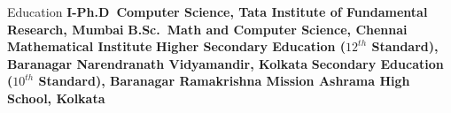 \begin{rubric}{Education}
\entry*[2024 -- current]%
	\textbf{I-Ph.D~Computer Science, Tata Institute of Fundamental Research, Mumbai} 
%
\entry*[2021 -- 2024]%
	\textbf{B.Sc.~Math and Computer Science, Chennai Mathematical Institute} 
% 
\entry*[2018 -- 2020]%
	\textbf{Higher Secondary Education ($12^{th}$ Standard), Baranagar Narendranath Vidyamandir, Kolkata}
%
\entry*[2008 -- 2018]%
	\textbf{Secondary Education ($10^{th}$ Standard), Baranagar Ramakrishna Mission Ashrama High School, Kolkata}
\end{rubric}
